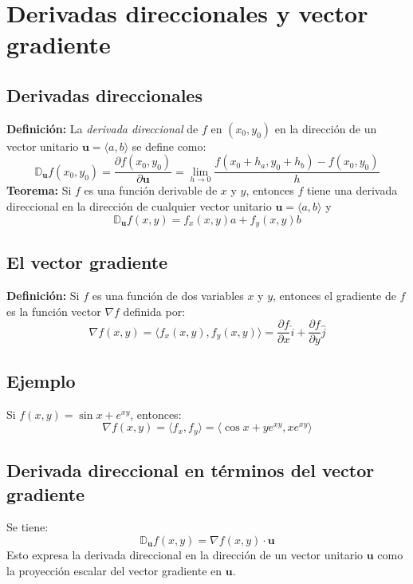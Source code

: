\documentclass[../main]{subfiles}
\begin{document}
\chapter{Derivadas direccionales y vector gradiente}
\section{Derivadas direccionales}
\textbf{Definición:} La \textit{derivada direccional} de $f$ en $(x_0,y_0)$ en la dirección de un vector unitario $\mathbf{u}=\langle a, b \rangle$ se define como:
\begin{equation}
    \mathbb{D}_{\mathbf{u}} f(x_0,y_0)=\dfrac{\partial f(x_0,y_0)}{\partial \mathbf{u}}=\lim_{h \rightarrow 0} \dfrac{f(x_0+h_a,y_0+h_b)-f(x_0,y_0)}{h}
\end{equation}
\textbf{Teorema:} Si $f$ es una función derivable de $x$ y $y$, entonces $f$ tiene una derivada direccional en la dirección de cualquier vector unitario $\mathbf{u}=\langle a,b \rangle$ y
\begin{equation}
    \mathbb{D}_{\mathbf{u}} f(x,y)=f_x (x,y)a+f_y (x,y)b
\end{equation}
\section{El vector gradiente}
\textbf{Definición:} Si $f$ es una función de dos variables $x$ y $y$, entonces el gradiente de $f$ es la función vector $\nabla f$ definida por:
\begin{equation}
    \nabla f(x,y)=\langle f_x (x,y), f_y(x,y) \rangle = \dfrac{\partial f}{\partial x} \hat{i}+\dfrac{\partial f}{\partial y} \hat{j}
\end{equation}

\section*{Ejemplo} 
Si $f(x,y)=\sin{x}+e^{xy}$, entonces:
$$
\nabla f(x,y)=\langle f_x , f_y \rangle= \langle \cos{x} +ye^{xy}, xe^{xy} \rangle
$$
\section{Derivada direccional en términos del vector gradiente}
Se tiene:
\begin{equation}
    \mathbb{D}_{\mathbf{u}} f(x,y)= \nabla f(x,y) \cdot \mathbf{u}
\end{equation}
Esto expresa la derivada direccional en la dirección de un vector unitario $\mathbf{u}$ como la proyección escalar del vector gradiente en $\mathbf{u}$.
\end{document}
